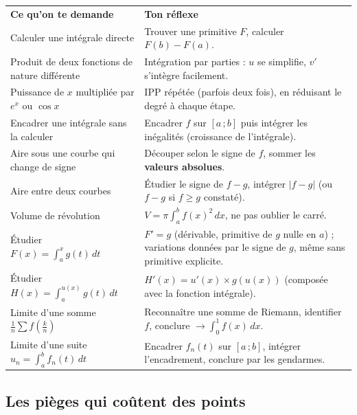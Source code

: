 \documentclass[11pt,a4paper]{article}
\begin{document}
\begin{center}
\renewcommand{\arraystretch}{1.45}
\sffamily\small
\begin{tabular}{>{\raggedright\arraybackslash}p{7.2cm} >{\raggedright\arraybackslash}p{8cm}}
\rowcolor{qtealdark} \color{white}\bfseries Ce qu'on te demande & \color{white}\bfseries Ton réflexe \\
\rowcolor{tealpale} Calculer une intégrale directe & Trouver une primitive $F$, calculer $F(b)-F(a)$. \\
Produit de deux fonctions de nature différente & Intégration par parties : $u$ se simplifie, $v'$ s'intègre facilement. \\
\rowcolor{tealpale} Puissance de $x$ multipliée par $e^x$ ou $\cos x$ & IPP répétée (parfois deux fois), en réduisant le degré à chaque étape. \\
Encadrer une intégrale sans la calculer & Encadrer $f$ sur $[a\,;b]$ puis intégrer les inégalités (croissance de l'intégrale). \\
\rowcolor{tealpale} Aire sous une courbe qui change de signe & Découper selon le signe de $f$, sommer les \textbf{valeurs absolues}. \\
Aire entre deux courbes & Étudier le signe de $f-g$, intégrer $|f-g|$ (ou $f-g$ si $f\geq g$ constaté). \\
\rowcolor{tealpale} Volume de révolution & $V=\pi\int_a^b f(x)^2\,dx$, ne pas oublier le carré. \\
Étudier $F(x)=\int_a^x g(t)\,dt$ & $F'=g$ (dérivable, primitive de $g$ nulle en $a$) ; variations données par le signe de $g$, même sans primitive explicite. \\
\rowcolor{tealpale} Étudier $H(x)=\int_a^{u(x)} g(t)\,dt$ & $H'(x)=u'(x)\times g(u(x))$ (composée avec la fonction intégrale). \\
\rowcolor{tealpale} Limite d'une somme $\frac1n\sum f\left(\frac kn\right)$ & Reconnaître une somme de Riemann, identifier $f$, conclure $\to\int_0^1f(x)\,dx$. \\
Limite d'une suite $u_n=\int_a^bf_n(t)\,dt$ & Encadrer $f_n(t)$ sur $[a\,;b]$, intégrer l'encadrement, conclure par les gendarmes. \\
\end{tabular}
\end{center}

\subsection{Les pièges qui coûtent des points}
\end{document}

